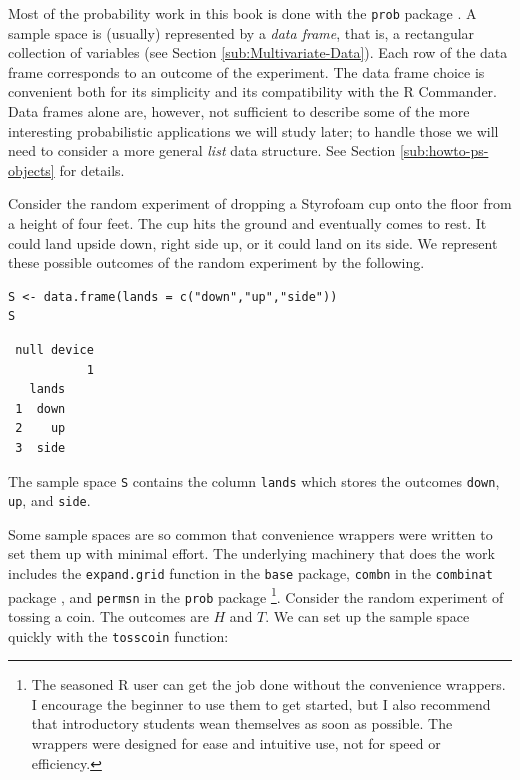 \documentclass[captions=tableheading]{scrbook}
\begin{document}
Most of the probability work in this book is done with the \texttt{prob} package \cite{Kernsprob}. A sample space is (usually) represented by a \emph{data frame}, that is, a rectangular collection of variables (see Section \ref{sub:Multivariate-Data}). Each row of the data frame corresponds to an outcome of the experiment. The data frame choice is convenient both for its simplicity and its compatibility with the \textsf{R} Commander. Data frames alone are, however, not sufficient to describe some of the more interesting probabilistic applications we will study later; to handle those we will need to consider a more general \emph{list} data structure. See Section \ref{sub:howto-ps-objects} for details.

\begin{example}
Consider the random experiment of dropping a Styrofoam cup onto the floor from a height of four feet. The cup hits the ground and eventually comes to rest. It could land upside down, right side up, or it could land on its side. We represent these possible outcomes of the random experiment by the following.


\begin{verbatim}
S <- data.frame(lands = c("down","up","side"))
S
\end{verbatim}

\begin{verbatim}
 null device 
           1
   lands
 1  down
 2    up
 3  side
\end{verbatim}

The sample space \texttt{S} contains the column \texttt{lands} which stores the outcomes \texttt{down}, \texttt{up}, and \texttt{side}. 

\end{example}

Some sample spaces are so common that convenience wrappers were written to set them up with minimal effort. The underlying machinery that does the work includes the \texttt{expand.grid} function in the \texttt{base} package, \texttt{combn} in the \texttt{combinat} package \cite{combinat}, and \texttt{permsn} in the \texttt{prob} package
\footnote{The seasoned \textsf{R} user can get the job done without the convenience wrappers. I encourage the beginner to use them to get started, but I also recommend that introductory students wean themselves as soon as possible. The wrappers were designed for ease and intuitive use, not for speed or efficiency.}.
Consider the random experiment of tossing a coin. The outcomes are \(H\) and \(T\). We can set up the sample space quickly with the \texttt{tosscoin} function:
\end{document}
